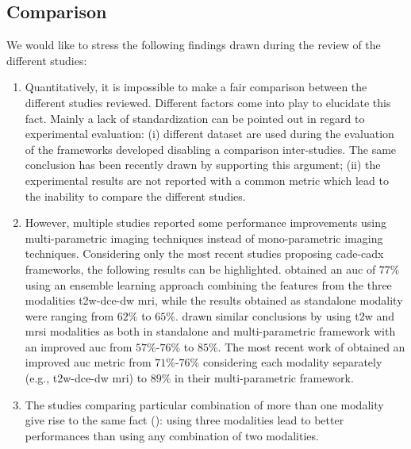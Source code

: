 \subsection{Comparison}

{\color{red} We would like to stress the following findings drawn during the review of the different studies:

\begin{enumerate}
	\item Quantitatively, it is impossible to make a fair comparison between the different studies reviewed. Different factors come into play to elucidate this fact. Mainly a lack of standardization can be pointed out in regard to experimental evaluation: (i) different dataset are used during the evaluation of the frameworks developed disabling a comparison inter-studies. The same conclusion has been recently drawn by \cite{Litjens2014} supporting this argument; (ii) the experimental results are not reported with a common metric which lead to the inability to compare the different studies.
	
	\item \label{here} However, multiple studies reported some performance improvements using multi-parametric imaging techniques instead of mono-parametric imaging techniques. Considering only the most recent studies proposing \ac{cade}-\ac{cadx} frameworks, the following results can be highlighted. 	
	\cite{Viswanath2011} obtained an \ac{auc} of $77\%$ using an ensemble learning approach combining the features from the three modalities \ac{t2w}-\ac{dce}-\ac{dw} \ac{mri}, while the results obtained as standalone modality were ranging from $62\%$ to $65\%$. 	
	\cite{Tiwari2013} drawn similar conclusions by using \ac{t2w} and \ac{mrsi} modalities as both in standalone and multi-parametric framework with an improved \ac{auc} from $57\%$-$76\%$ to $85\%$. 	
	The most recent work of \cite{Litjens2014} obtained an improved \ac{auc} metric from $71\%$-$76\%$ considering each modality separately (e.g., \ac{t2w}-\ac{dce}-\ac{dw} \ac{mri}) to $89\%$ in their multi-parametric framework.
	
		\item The studies comparing particular combination of more than one modality give rise to the same fact (\cite{Ozer2010,Litjens2011,Liu2013,Litjens2014}): using three modalities lead to better performances than using any combination of two modalities. 
	

\end{enumerate}}
